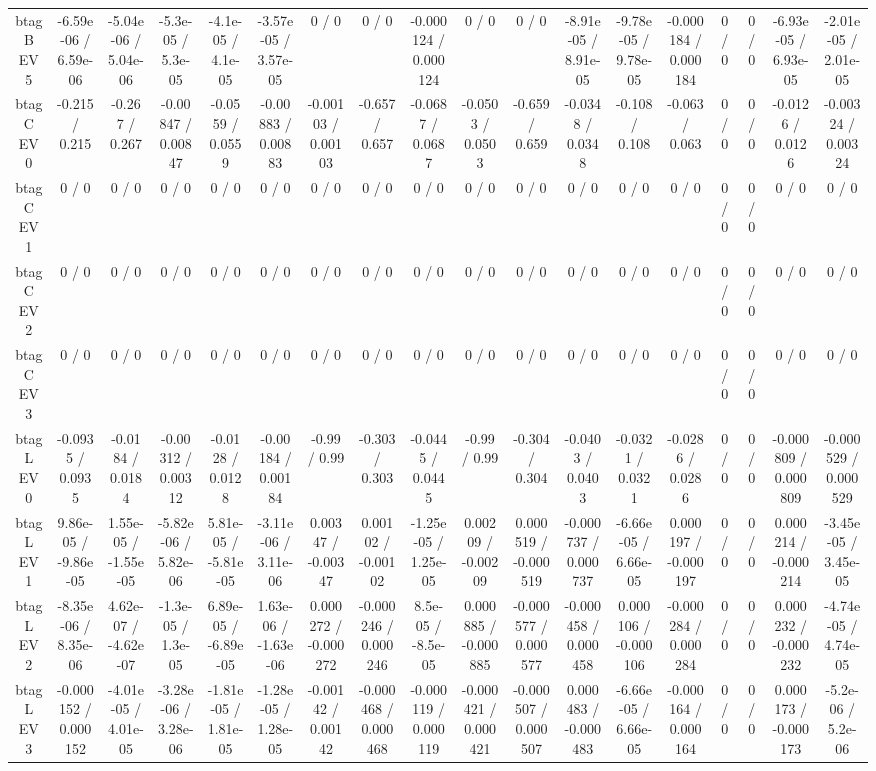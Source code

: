 \documentclass[10pt]{article}
\begin{document}
\begin{table}[htbp]
\begin{center}
\begin{tabular}{|c|c|c|c|c|c|c|c|c|c|c|c|c|c|c|c|c|c|}
  btag B EV 5 & -6.59e-06 / 6.59e-06 & -5.04e-06 / 5.04e-06 & -5.3e-05 / 5.3e-05 & -4.1e-05 / 4.1e-05 & -3.57e-05 / 3.57e-05 & 0 / 0 & 0 / 0 & -0.000124 / 0.000124 & 0 / 0 & 0 / 0 & -8.91e-05 / 8.91e-05 & -9.78e-05 / 9.78e-05 & -0.000184 / 0.000184 & 0 / 0 & 0 / 0 & -6.93e-05 / 6.93e-05 & -2.01e-05 / 2.01e-05 \\ 
  btag C EV 0 & -0.215 / 0.215 & -0.267 / 0.267 & -0.00847 / 0.00847 & -0.0559 / 0.0559 & -0.00883 / 0.00883 & -0.00103 / 0.00103 & -0.657 / 0.657 & -0.0687 / 0.0687 & -0.0503 / 0.0503 & -0.659 / 0.659 & -0.0348 / 0.0348 & -0.108 / 0.108 & -0.063 / 0.063 & 0 / 0 & 0 / 0 & -0.0126 / 0.0126 & -0.00324 / 0.00324 \\ 
  btag C EV 1 & 0 / 0 & 0 / 0 & 0 / 0 & 0 / 0 & 0 / 0 & 0 / 0 & 0 / 0 & 0 / 0 & 0 / 0 & 0 / 0 & 0 / 0 & 0 / 0 & 0 / 0 & 0 / 0 & 0 / 0 & 0 / 0 & 0 / 0 \\ 
  btag C EV 2 & 0 / 0 & 0 / 0 & 0 / 0 & 0 / 0 & 0 / 0 & 0 / 0 & 0 / 0 & 0 / 0 & 0 / 0 & 0 / 0 & 0 / 0 & 0 / 0 & 0 / 0 & 0 / 0 & 0 / 0 & 0 / 0 & 0 / 0 \\ 
  btag C EV 3 & 0 / 0 & 0 / 0 & 0 / 0 & 0 / 0 & 0 / 0 & 0 / 0 & 0 / 0 & 0 / 0 & 0 / 0 & 0 / 0 & 0 / 0 & 0 / 0 & 0 / 0 & 0 / 0 & 0 / 0 & 0 / 0 & 0 / 0 \\ 
  btag L EV 0 & -0.0935 / 0.0935 & -0.0184 / 0.0184 & -0.00312 / 0.00312 & -0.0128 / 0.0128 & -0.00184 / 0.00184 & -0.99 / 0.99 & -0.303 / 0.303 & -0.0445 / 0.0445 & -0.99 / 0.99 & -0.304 / 0.304 & -0.0403 / 0.0403 & -0.0321 / 0.0321 & -0.0286 / 0.0286 & 0 / 0 & 0 / 0 & -0.000809 / 0.000809 & -0.000529 / 0.000529 \\ 
  btag L EV 1 & 9.86e-05 / -9.86e-05 & 1.55e-05 / -1.55e-05 & -5.82e-06 / 5.82e-06 & 5.81e-05 / -5.81e-05 & -3.11e-06 / 3.11e-06 & 0.00347 / -0.00347 & 0.00102 / -0.00102 & -1.25e-05 / 1.25e-05 & 0.00209 / -0.00209 & 0.000519 / -0.000519 & -0.000737 / 0.000737 & -6.66e-05 / 6.66e-05 & 0.000197 / -0.000197 & 0 / 0 & 0 / 0 & 0.000214 / -0.000214 & -3.45e-05 / 3.45e-05 \\ 
  btag L EV 2 & -8.35e-06 / 8.35e-06 & 4.62e-07 / -4.62e-07 & -1.3e-05 / 1.3e-05 & 6.89e-05 / -6.89e-05 & 1.63e-06 / -1.63e-06 & 0.000272 / -0.000272 & -0.000246 / 0.000246 & 8.5e-05 / -8.5e-05 & 0.000885 / -0.000885 & -0.000577 / 0.000577 & -0.000458 / 0.000458 & 0.000106 / -0.000106 & -0.000284 / 0.000284 & 0 / 0 & 0 / 0 & 0.000232 / -0.000232 & -4.74e-05 / 4.74e-05 \\ 
  btag L EV 3 & -0.000152 / 0.000152 & -4.01e-05 / 4.01e-05 & -3.28e-06 / 3.28e-06 & -1.81e-05 / 1.81e-05 & -1.28e-05 / 1.28e-05 & -0.00142 / 0.00142 & -0.000468 / 0.000468 & -0.000119 / 0.000119 & -0.000421 / 0.000421 & -0.000507 / 0.000507 & 0.000483 / -0.000483 & -6.66e-05 / 6.66e-05 & -0.000164 / 0.000164 & 0 / 0 & 0 / 0 & 0.000173 / -0.000173 & -5.2e-06 / 5.2e-06 \\ 

\end{tabular}
\end{center}
\end{table}
\end{document}
